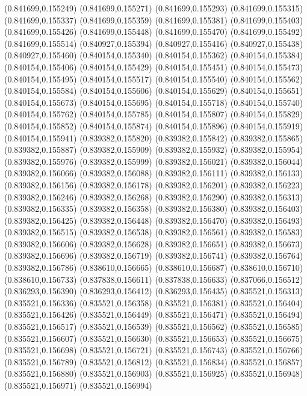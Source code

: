 (0.841699,0.155249)
(0.841699,0.155271)
(0.841699,0.155293)
(0.841699,0.155315)
(0.841699,0.155337)
(0.841699,0.155359)
(0.841699,0.155381)
(0.841699,0.155403)
(0.841699,0.155426)
(0.841699,0.155448)
(0.841699,0.155470)
(0.841699,0.155492)
(0.841699,0.155514)
(0.840927,0.155394)
(0.840927,0.155416)
(0.840927,0.155438)
(0.840927,0.155460)
(0.840154,0.155340)
(0.840154,0.155362)
(0.840154,0.155384)
(0.840154,0.155406)
(0.840154,0.155429)
(0.840154,0.155451)
(0.840154,0.155473)
(0.840154,0.155495)
(0.840154,0.155517)
(0.840154,0.155540)
(0.840154,0.155562)
(0.840154,0.155584)
(0.840154,0.155606)
(0.840154,0.155629)
(0.840154,0.155651)
(0.840154,0.155673)
(0.840154,0.155695)
(0.840154,0.155718)
(0.840154,0.155740)
(0.840154,0.155762)
(0.840154,0.155785)
(0.840154,0.155807)
(0.840154,0.155829)
(0.840154,0.155852)
(0.840154,0.155874)
(0.840154,0.155896)
(0.840154,0.155919)
(0.840154,0.155941)
(0.839382,0.155820)
(0.839382,0.155842)
(0.839382,0.155865)
(0.839382,0.155887)
(0.839382,0.155909)
(0.839382,0.155932)
(0.839382,0.155954)
(0.839382,0.155976)
(0.839382,0.155999)
(0.839382,0.156021)
(0.839382,0.156044)
(0.839382,0.156066)
(0.839382,0.156088)
(0.839382,0.156111)
(0.839382,0.156133)
(0.839382,0.156156)
(0.839382,0.156178)
(0.839382,0.156201)
(0.839382,0.156223)
(0.839382,0.156246)
(0.839382,0.156268)
(0.839382,0.156290)
(0.839382,0.156313)
(0.839382,0.156335)
(0.839382,0.156358)
(0.839382,0.156380)
(0.839382,0.156403)
(0.839382,0.156425)
(0.839382,0.156448)
(0.839382,0.156470)
(0.839382,0.156493)
(0.839382,0.156515)
(0.839382,0.156538)
(0.839382,0.156561)
(0.839382,0.156583)
(0.839382,0.156606)
(0.839382,0.156628)
(0.839382,0.156651)
(0.839382,0.156673)
(0.839382,0.156696)
(0.839382,0.156719)
(0.839382,0.156741)
(0.839382,0.156764)
(0.839382,0.156786)
(0.838610,0.156665)
(0.838610,0.156687)
(0.838610,0.156710)
(0.838610,0.156733)
(0.837838,0.156611)
(0.837838,0.156633)
(0.837066,0.156512)
(0.836293,0.156390)
(0.836293,0.156412)
(0.836293,0.156435)
(0.835521,0.156313)
(0.835521,0.156336)
(0.835521,0.156358)
(0.835521,0.156381)
(0.835521,0.156404)
(0.835521,0.156426)
(0.835521,0.156449)
(0.835521,0.156471)
(0.835521,0.156494)
(0.835521,0.156517)
(0.835521,0.156539)
(0.835521,0.156562)
(0.835521,0.156585)
(0.835521,0.156607)
(0.835521,0.156630)
(0.835521,0.156653)
(0.835521,0.156675)
(0.835521,0.156698)
(0.835521,0.156721)
(0.835521,0.156743)
(0.835521,0.156766)
(0.835521,0.156789)
(0.835521,0.156812)
(0.835521,0.156834)
(0.835521,0.156857)
(0.835521,0.156880)
(0.835521,0.156903)
(0.835521,0.156925)
(0.835521,0.156948)
(0.835521,0.156971)
(0.835521,0.156994)

